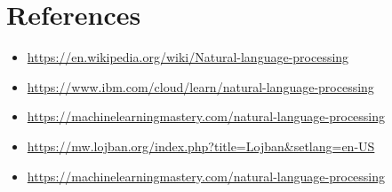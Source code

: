 \documentclass[11pt]{article}
\begin{document}
\section{References}
\label{sec:orgb7e235b}
\begin{itemize}
\item \url{https://en.wikipedia.org/wiki/Natural-language-processing}
\item \url{https://www.ibm.com/cloud/learn/natural-language-processing}
\item \url{https://machinelearningmastery.com/natural-language-processing}
\item \url{https://mw.lojban.org/index.php?title=Lojban\&setlang=en-US}
\item \url{https://machinelearningmastery.com/natural-language-processing}
\end{itemize}
\end{document}

